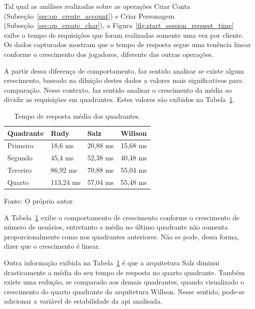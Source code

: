 Tal qual as análises realizadas sobre as operações Criar Conta (Subseção~\ref{sec:op_create_account}) e Criar Personagem (Subseção~\ref{sec:op_create_char}), a Figura~\ref{fig:start_session_request_time} exibe o tempo de requisições que foram realizadas somente uma vez por cliente.
%
Os dados capturados mostram que o tempo de resposta segue uma tenência linear conforme o crescimento dos jogadores, diferente das outras operações.

A partir dessa diferença de comportamento, faz sentido analisar se existe algum crescimento, baseado na diluição destes dados a valores mais significativos para comparação.
%
Nesse contexto, faz sentido analisar o crescimento da média ao dividir as requisições em quadrantes.
%
Estes valores são exibidos na Tabela~\ref{tab:op_start_session}.

\begin{table}[htb!]
\centering
\begin{adjustbox}{max width=\textwidth}
\caption{Tempo de resposta médio dos quadrantes.}
\label{tab:op_start_session}
\begin{tabular}{l|l|l|l}

\hline \hline

Quadrante & Rudy    & Salz    & Willson \\ \hline \hline

Primeiro  & 18,6 ms & 20,88 ms & 15,68 ms \\ \hline

Segundo   & 45,4 ms & 52,38 ms & 40,48 ms \\ \hline

Terceiro  & 86,92 ms & 70,88 ms & 55,04 ms \\ \hline

Quarto    & 113,24 ms & 57,04 ms & 55,48 ms \\ \hline \hline

\end{tabular}

\end{adjustbox}

Fonte: O próprio autor.
\end{table}

A Tabela~\ref{tab:op_start_session} exibe o comportamento de crescimento conforme o crescimento de número de usuários, entretanto a média no último quadrante não aumenta proporcionalmente como nos quadrantes anteriores.
%
Não se pode, dessa forma, dizer que o crescimento é linear.

Outra informação exibida na Tabela~\ref{tab:op_start_session} é que a arquitetura Salz diminui drasticamente a média do seu tempo de resposta no quarto quadrante.
%
Também existe uma redução, se comparado aos demais quadrantes, quando visualizado o crescimento do quarto quadrante da arquitetura Willson.
%
Nesse sentido, pode-se adicionar a variável de estabilidade da \ac{api} analisada.


